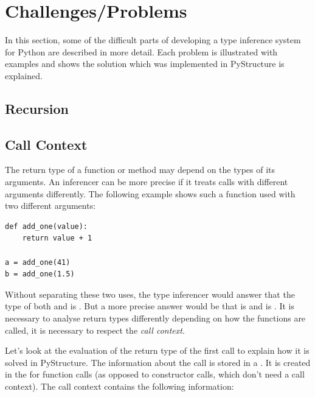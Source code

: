 \documentclass[12pt,halfparskip,DIV11,BCOR10mm]{scrreprt}
\begin{document}

\section{Challenges/Problems}

In this section, some of the difficult parts of developing a type inference system for Python are described in more detail. Each problem is illustrated with examples and shows the solution which was implemented in PyStructure is explained.

\subsection{Recursion}


\subsection{Call Context}

The return type of a function or method may depend on the types of its arguments. An inferencer can be more precise if it treats calls with different arguments differently. The following example shows such a function used with two different arguments:

\begin{lstlisting}
def add_one(value):
    return value + 1

a = add_one(41)
b = add_one(1.5)
\end{lstlisting}


Without separating these two uses, the type inferencer would answer that the type of both  and  is . But a more precise answer would be that  is  and  is . It is necessary to analyse return types differently depending on how the functions are called, it is necessary to respect the \emph{call context}.

Let's look at the evaluation of the return type of the first  call to explain how it is solved in PyStructure. The information about the call is stored in a . It is created in the  for function calls (as opposed to constructor calls, which don't need a call context). The call context contains the following information:
\end{document}
